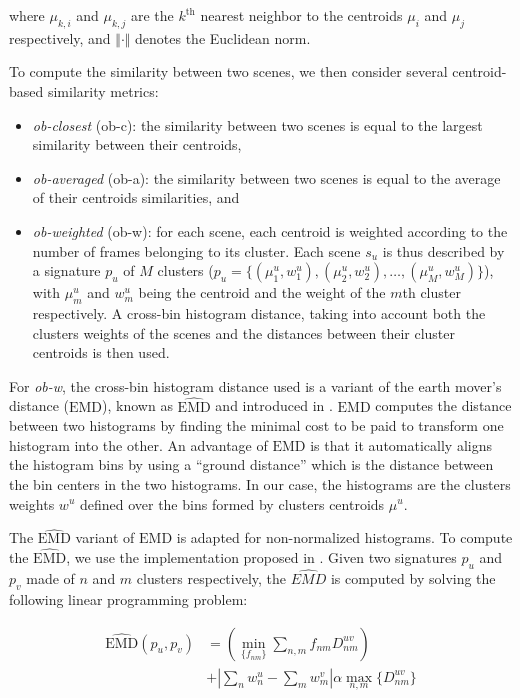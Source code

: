 \documentclass[journal]{IEEEtran}
\newcommand*{\EMD}{\mathrm{EMD}}
\begin{document}
where $\mu_{k,i}$ and $\mu_{k,j}$ are the $k^{\textrm{th}}$ nearest neighbor to the centroids $\mu_i$ and $\mu_j$ respectively, and $\Vert \cdot \Vert$ denotes the Euclidean norm.

To compute the similarity between two scenes, we then consider several centroid-based similarity metrics:

\begin{itemize}
\item \emph{ob-closest} (ob-c): the similarity between two scenes is equal to the largest similarity between their centroids,
\item \emph{ob-averaged} (ob-a): the similarity between two scenes is equal to the average of their centroids similarities, and
\item \emph{ob-weighted} (ob-w): for each scene, each centroid is weighted according to the number of frames belonging to its cluster. Each scene $s_u$ is thus described by a signature $p_u$ of $M$ clusters ($p_u=\lbrace(\mu_1^u,w_1^u),(\mu_2^u,w_2^u),\ldots,(\mu_M^u,w_M^u)\rbrace$), with $\mu_m^u$ and $w_m^u$ being the centroid and the weight of the $m$th cluster respectively. A cross-bin histogram distance, taking into account both the clusters weights of the scenes and the distances between their cluster centroids is then used. 
\end{itemize}

For \emph{ob-w}, the cross-bin histogram distance used is a variant of the earth mover's distance ($\EMD$), known as $\widehat{\EMD}$ and introduced in \cite{pele2008linear}. $\EMD$ computes the distance between two histograms by finding the minimal cost to be paid to transform one histogram into the other. An advantage of $\EMD$ is that it automatically aligns the histogram bins by using a ``ground distance'' which is the distance between the bin centers in the two histograms. In our case, the histograms are the clusters weights $w^u$ defined over the bins formed by clusters centroids $\mu^u$.

The $\widehat{\EMD}$ variant of $\EMD$ is adapted for non-normalized histograms. To compute the $\widehat{\EMD}$, we use the implementation proposed in \cite{pele2009fast}. Given two signatures $p_u$ and $p_v$ made of $n$ and $m$ clusters respectively, the $\widehat{EMD}$ is computed by solving the following linear programming problem:

\begin{equation}
\begin{split}
\widehat{\EMD}(p_u,p_v) &=\left( \min\limits_{\lbrace f_{nm}\rbrace} \sum\limits_{n,m} f_{nm}D_{nm}^{uv} \right) \\
&+ \left|\sum\limits_{n} w_n^u - \sum\limits_{m} w_m^v  \right| \alpha \max\limits_{n,m}\lbrace  D_{nm}^{uv}\rbrace
\end{split}
\end{equation}
\end{document}
